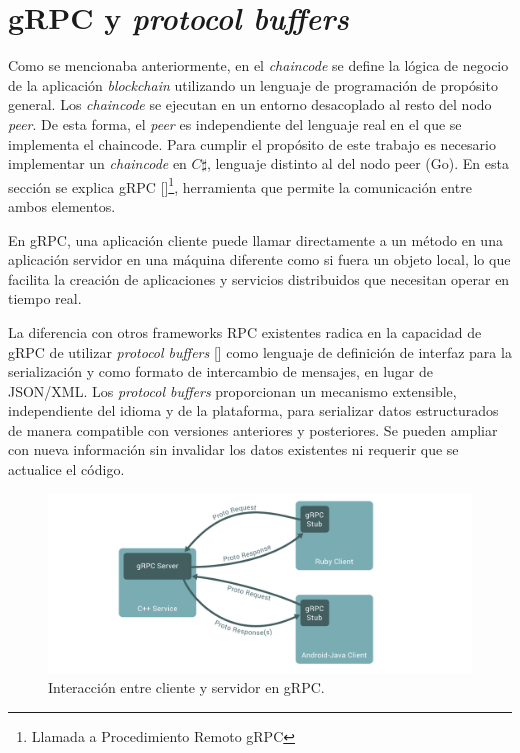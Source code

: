 \section{gRPC y \textit{protocol buffers}}
Como se mencionaba anteriormente, en el \textit{chaincode} se define la lógica de negocio de la aplicación \textit{blockchain} utilizando un lenguaje de programación de propósito general. Los \textit{chaincode} se ejecutan en un entorno desacoplado al resto del nodo \textit{peer}. De esta forma, el \textit{peer} es independiente del lenguaje real en el que se implementa el chaincode. Para cumplir el propósito de este trabajo es necesario implementar un \textit{chaincode} en $ C\sharp$, lenguaje distinto al del nodo peer (Go). En esta sección se explica gRPC  [\cite{grpc-doc}]\footnote{Llamada a Procedimiento Remoto gRPC}, herramienta que permite la comunicación entre ambos elementos. 

En gRPC, una aplicación cliente puede llamar directamente a un método en una aplicación servidor en una máquina diferente como si fuera un objeto local, lo que facilita la creación de aplicaciones y servicios distribuidos que necesitan operar en tiempo real. 


La diferencia con otros frameworks RPC existentes radica en la capacidad de gRPC de utilizar \textit{protocol buffers} [\cite{protobuf-doc}] como lenguaje de definición de interfaz para la serialización y como formato de intercambio de mensajes, en lugar de JSON/XML.
%
Los \textit{protocol buffers} proporcionan un mecanismo extensible, independiente del idioma y de la plataforma, para serializar datos estructurados de manera compatible con versiones anteriores y posteriores. Se pueden ampliar con nueva información sin invalidar los datos existentes ni requerir que se actualice el código.

\begin{figure}[tbph]
\centering
\includegraphics[width=\textwidth]{Images/grpc}
\caption{ Interacción entre cliente y servidor en gRPC.}
\label{fig:grpc}
\end{figure}


